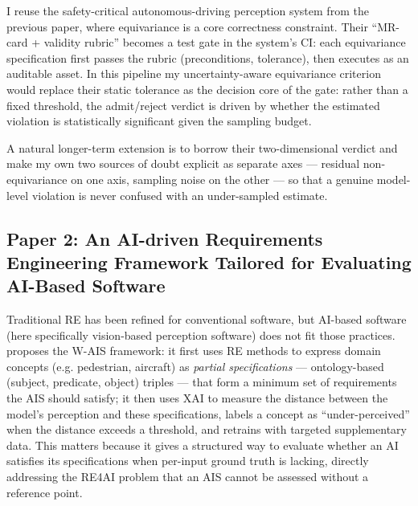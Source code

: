 \documentclass[11pt, a4paper]{article}
\begin{document}
I reuse the safety-critical autonomous-driving perception system from the previous paper, where equivariance is a core correctness constraint. Their ``MR-card + validity rubric'' becomes a test gate in the system's CI: each equivariance specification first passes the rubric (preconditions, tolerance), then executes as an auditable asset. In this pipeline my uncertainty-aware equivariance criterion would replace their static tolerance as the decision core of the gate: rather than a fixed threshold, the admit/reject verdict is driven by whether the estimated violation is statistically significant given the sampling budget.

A natural longer-term extension is to borrow their two-dimensional verdict and make my own two sources of doubt explicit as separate axes — residual non-equivariance on one axis, sampling noise on the other — so that a genuine model-level violation is never confused with an under-sampled estimate.

\subsection{Paper 2: An AI-driven Requirements Engineering Framework Tailored for Evaluating AI-Based Software}

Traditional RE has been refined for conventional software, but AI-based software (here specifically vision-based perception software) does not fit those practices. \cite{barzaminiAIdrivenRequirementsEngineering2025} proposes the W-AIS framework: it first uses RE methods to express domain concepts (e.g. pedestrian, aircraft) as \emph{partial specifications} — ontology-based (subject, predicate, object) triples — that form a minimum set of requirements the AIS should satisfy; it then uses XAI to measure the distance between the model's perception and these specifications, labels a concept as ``under-perceived'' when the distance exceeds a threshold, and retrains with targeted supplementary data. This matters because it gives a structured way to evaluate whether an AI satisfies its specifications when per-input ground truth is lacking, directly addressing the RE4AI problem that an AIS cannot be assessed without a reference point.
\end{document}
